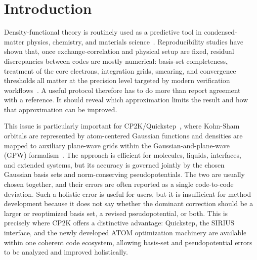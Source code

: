 \documentclass[aps,prb,reprint,amsmath,amssymb,superscriptaddress,longbibliography,floatfix]{revtex4-2}
\begin{document}
\maketitle

\section{Introduction}

Density-functional theory is routinely used as a predictive tool in condensed-matter physics, chemistry, and materials science~\cite{Kohn1999RMP,Jones2015RMP}. Reproducibility studies have shown that, once exchange-correlation and physical setup are fixed, residual discrepancies between codes are mostly numerical: basis-set completeness, treatment of the core electrons, integration grids, smearing, and convergence thresholds all matter at the precision level targeted by modern verification workflows~\cite{Lejaeghere2014,Lejaeghere2016,Huber2021,Bosoni2024}. A useful protocol therefore has to do more than report agreement with a reference. It should reveal which approximation limits the result and how that approximation can be improved.

This issue is particularly important for CP2K/Quickstep~\cite{CP2K2020,CP2KMadeSimple2026}, where Kohn-Sham orbitals are represented by atom-centered Gaussian functions and densities are mapped to auxiliary plane-wave grids within the Gaussian-and-plane-wave (GPW) formalism~\cite{Lippert1997GPW}. The approach is efficient for molecules, liquids, interfaces, and extended systems, but its accuracy is governed jointly by the chosen Gaussian basis sets and norm-conserving pseudopotentials. The two are usually chosen together, and their errors are often reported as a single code-to-code deviation. Such a holistic error is useful for users, but it is insufficient for method development because it does not say whether the dominant correction should be a larger or reoptimized basis set, a revised pseudopotential, or both. This is precisely where CP2K offers a distinctive advantage: Quickstep, the SIRIUS interface, and the newly developed ATOM optimization machinery are available within one coherent code ecosystem, allowing basis-set and pseudopotential errors to be analyzed and improved holistically.
\end{document}
